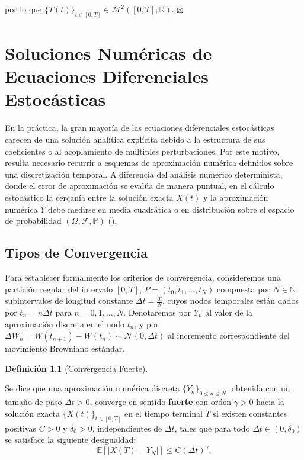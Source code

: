 \documentclass[
  spanish,
  us-letterpaper,
]{scrreprt}
\numberwithin{equation}{section}
\theoremstyle{plain}
\theoremstyle{plain}
\theoremstyle{definition}
\newtheorem{definition}{Definición}[chapter]
\theoremstyle{plain}
\theoremstyle{remark}
\begin{document}
por lo que
\(\{T(t)\}_{t \in [0, T]} \in \mathcal{M}^2([0, T]; \mathbb{R})\).
\(\boxtimes\)

\chapter{Soluciones Numéricas de Ecuaciones Diferenciales
Estocásticas}\label{sec-numerico}

En la práctica, la gran mayoría de las ecuaciones diferenciales
estocásticas carecen de una solución analítica explícita debido a la
estructura de sus coeficientes o al acoplamiento de múltiples
perturbaciones. Por este motivo, resulta necesario recurrir a esquemas
de aproximación numérica definidos sobre una discretización temporal. A
diferencia del análisis numérico determinista, donde el error de
aproximación se evalúa de manera puntual, en el cálculo estocástico la
cercanía entre la solución exacta \(X(t)\) y la aproximación numérica
\(Y\) debe medirse en media cuadrática o en distribución sobre el
espacio de probabilidad \((\Omega, \mathcal{F}, \mathbb{P})\)
().

\section{Tipos de Convergencia}\label{tipos-de-convergencia}

Para establecer formalmente los criterios de convergencia, consideremos
una partición regular del intervalo \([0, T]\),
\(P = (t_0, t_1, \dots, t_N)\) compuesta por \(N \in \mathbb{N}\)
subintervalos de longitud constante \(\Delta t = \frac{T}{N}\), cuyos
nodos temporales están dados por \(t_n = n \Delta t\) para
\(n = 0, 1, \dots, N\). Denotaremos por \(Y_n\) al valor de la
aproximación discreta en el nodo \(t_n\), y por
\(\Delta W_n = W(t_{n+1}) - W(t_n) \sim \mathcal{N}(0, \Delta t)\) al
incremento correspondiente del movimiento Browniano estándar.

\begin{definition}[Convergencia
Fuerte]\protect\hypertarget{def-convergencia-fuerte}{}\label{def-convergencia-fuerte}

Se dice que una aproximación numérica discreta
\(\{Y_n\}_{0 \le n \le N}\), obtenida con un tamaño de paso
\(\Delta t > 0\), converge en sentido \textbf{fuerte} con orden
\(\gamma > 0\) hacia la solución exacta \(\{X(t)\}_{t \in [0, T]}\) en
el tiempo terminal \(T\) si existen constantes positivas \(C > 0\) y
\(\delta_0 > 0\), independientes de \(\Delta t\), tales que para todo
\(\Delta t \in (0, \delta_0)\) se satisface la siguiente desigualdad: \[
\mathbb{E}\left[ \vert X(T) - Y_N \vert \right] \le C (\Delta t)^\gamma.
\]

\end{definition}
\end{document}

